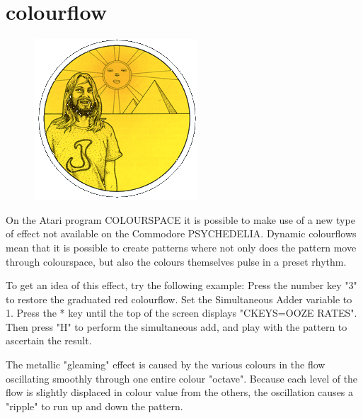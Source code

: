 \chapter{colourflow} 
\label{sec:presets}
\lstset{style=6502Style}
\begin{definition}
\setlength{\intextsep}{0pt}%
\setlength{\columnsep}{3pt}%
\begin{figure}
\includegraphics[width=\linewidth]{src/callout/psych.png} 
\end{figure}
\small
On the Atari program COLOURSPACE it is possible to make use of a new type of
effect not available on the Commodore PSYCHEDELIA.  Dynamic colourflows mean
that it is possible to create patterns where not only does the pattern move
through colourspace, but also the colours themselves pulse in a preset rhythm.

To get an idea of this effect, try the following example:  Press the number key
"3" to restore the graduated red colourflow.  Set the Simultaneous Adder
variable to 1.  Press the * key until the top of the screen displays
"CKEYS=OOZE RATES".  Then press "H" to perform the simultaneous add, and play
with the pattern to ascertain the result.

The metallic "gleaming" effect is caused by the various colours in the flow
oscillating smoothly through one entire colour "octave".  Because each level of
the flow is slightly displaced in colour value from the others, the oscillation
causes a "ripple" to run up and down the pattern.


\end{definition}
